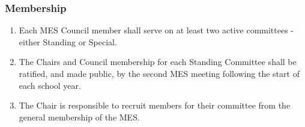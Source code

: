\hypertarget{membership}{%
 \subsubsection{Membership}
 \label{membership}}
\begin{enumerate}
 \item
  Each MES Council member shall serve on at least two active committees
  - either Standing or Special.
 \item
  The Chairs and Council membership for each Standing Committee shall be
  ratified, and made public, by the second MES meeting following the
  start of each school year.
 \item
  The Chair is responsible to recruit members for their committee from
  the general membership of the MES.

\end{enumerate}

